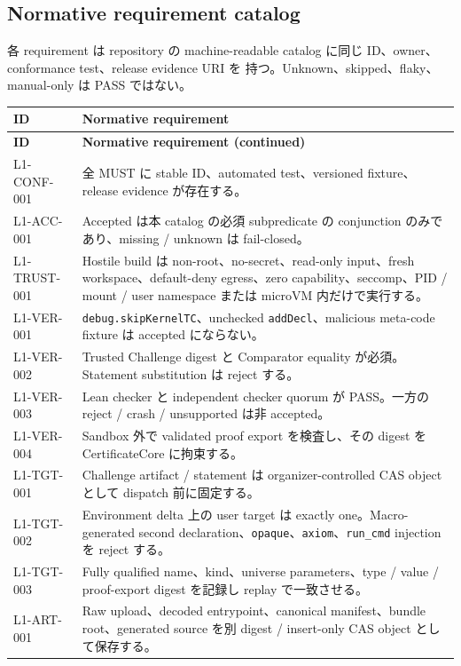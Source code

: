 \documentclass[a4paper,11pt]{ltjsarticle}
\newcommand{\code}[1]{\texttt{#1}}
\begin{document}
\subsection{Normative requirement catalog}

各 requirement は repository の machine-readable catalog に同じ ID、owner、conformance test、release evidence URI を
持つ。Unknown、skipped、flaky、manual-only は PASS ではない。

\begin{longtable}{@{}L{28mm}L{127mm}@{}}
\toprule
\textbf{ID} & \textbf{Normative requirement} \\
\midrule
\endfirsthead
\toprule
\textbf{ID} & \textbf{Normative requirement (continued)} \\
\midrule
\endhead
L1-CONF-001 & 全 MUST に stable ID、automated test、versioned fixture、release evidence が存在する。 \\
L1-ACC-001 & Accepted は本 catalog の必須 subpredicate の conjunction のみであり、missing / unknown は fail-closed。 \\
L1-TRUST-001 & Hostile build は non-root、no-secret、read-only input、fresh workspace、default-deny egress、zero capability、seccomp、PID / mount / user namespace または microVM 内だけで実行する。 \\
L1-VER-001 & \code{debug.skipKernelTC}、unchecked \code{addDecl}、malicious meta-code fixture は accepted にならない。 \\
L1-VER-002 & Trusted Challenge digest と Comparator equality が必須。Statement substitution は reject する。 \\
L1-VER-003 & Lean checker と independent checker quorum が PASS。一方の reject / crash / unsupported は非 accepted。 \\
L1-VER-004 & Sandbox 外で validated proof export を検査し、その digest を CertificateCore に拘束する。 \\
L1-TGT-001 & Challenge artifact / statement は organizer-controlled CAS object として dispatch 前に固定する。 \\
L1-TGT-002 & Environment delta 上の user target は exactly one。Macro-generated second declaration、\code{opaque}、\code{axiom}、\code{run\_cmd} injection を reject する。 \\
L1-TGT-003 & Fully qualified name、kind、universe parameters、type / value / proof-export digest を記録し replay で一致させる。 \\
L1-ART-001 & Raw upload、decoded entrypoint、canonical manifest、bundle root、generated source を別 digest / insert-only CAS object として保存する。 \\

\end{longtable}
\end{document}
